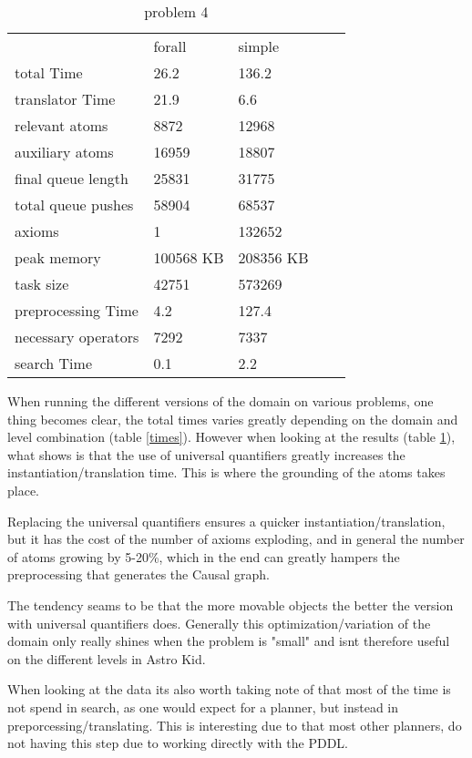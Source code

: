 \begin{table}[h]
	\centering
	\caption{problem 4}
	\label{prob4}
	\begin{tabular}{lllll}
		& forall & simple  \\
		total Time & 26.2 & 136.2 \\
		translator Time& 21.9 & 6.6 \\
		
		
		relevant atoms & 8872 & 12968\\
		auxiliary atoms & 16959& 18807\\
		final queue length &25831 & 31775\\
		total queue pushes &58904 & 68537\\
		axioms & 1 & 132652 \\ 
		peak memory & 100568 KB & 208356 KB\\ 
		task size & 42751 & 573269\\
		
		
		preprocessing Time& 4.2 & 127.4 \\
		necessary operators & 7292 & 7337\\
		
		
		search Time & 0.1 & 2.2 \\
	\end{tabular}
\end{table}
When running the different versions of the domain on various problems, one thing becomes clear, the total times varies greatly depending on the domain and level combination (table \ref{times}). However when looking at the results (table \ref{prob4}), what shows is that the use of universal quantifiers greatly increases the instantiation/translation time. This is where the grounding of the atoms takes place.

Replacing the universal quantifiers ensures a quicker instantiation/translation, but it has the cost of the number of axioms exploding, and in general the number of atoms growing by 5-20\%, which in the end can greatly hampers the preprocessing that generates the Causal graph.

The tendency seams to be that the more movable objects the better the version with universal quantifiers does. Generally this optimization/variation of the domain only really shines when the problem is "small" and isnt therefore useful on the different levels in Astro Kid.


When looking at the data its also worth taking note of that most of the time is not spend in search, as one would expect for a planner, but instead in preporcessing/translating. This is interesting due to that most other planners, do not having this step due to working directly with the PDDL. 


